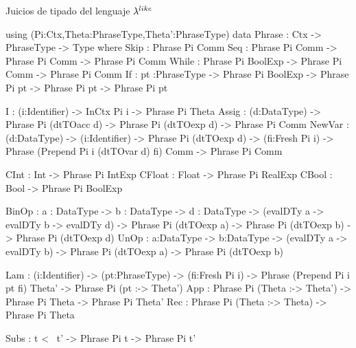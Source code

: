 \noindent Juicios de tipado del lenguaje $\lambda^{like}$
\begin{code}
using (Pi:Ctx,Theta:PhraseType,Theta':PhraseType)
    data Phrase : Ctx -> PhraseType -> Type where
        Skip    : Phrase Pi Comm
        Seq     : Phrase Pi Comm -> Phrase Pi Comm -> Phrase Pi Comm
        While   : Phrase Pi BoolExp -> Phrase Pi Comm -> Phrase Pi Comm
        If      : {pt :PhraseType} -> Phrase Pi BoolExp -> 
                  Phrase Pi pt -> Phrase Pi pt -> Phrase Pi pt
        
        I       : (i:Identifier) -> InCtx Pi i -> Phrase Pi Theta
        Assig   : (d:DataType) -> Phrase Pi (dtTOacc d) -> 
                  Phrase Pi (dtTOexp d) -> Phrase Pi Comm
        NewVar : (d:DataType) -> (i:Identifier) -> Phrase Pi (dtTOexp d) -> 
                 (fi:Fresh Pi i) -> Phrase (Prepend Pi i (dtTOvar d) fi) Comm -> 
                 Phrase Pi Comm
        
        CInt    : Int   -> Phrase Pi IntExp
        CFloat  : Float -> Phrase Pi RealExp
        CBool   : Bool  -> Phrase Pi BoolExp
        
        BinOp : {a : DataType} -> {b : DataType} -> {d : DataType} -> 
                (evalDTy a -> evalDTy b -> evalDTy d) -> 
                Phrase Pi (dtTOexp a) -> Phrase Pi (dtTOexp b) -> Phrase Pi (dtTOexp d)
        UnOp  : {a:DataType} -> {b:DataType} -> 
                (evalDTy a -> evalDTy b) -> 
                Phrase Pi (dtTOexp a)  -> Phrase Pi (dtTOexp b) 

        Lam   : (i:Identifier) -> (pt:PhraseType) -> (fi:Fresh Pi i) ->
                Phrase (Prepend Pi i pt fi) Theta' -> 
                Phrase Pi (pt :-> Theta')
        App    : Phrase Pi (Theta :-> Theta') -> Phrase Pi Theta -> 
                 Phrase Pi Theta'
        Rec    : Phrase Pi (Theta :-> Theta) -> Phrase Pi Theta
        
        Subs   : t <~ t' -> Phrase Pi t -> Phrase Pi t'
\end{code}

